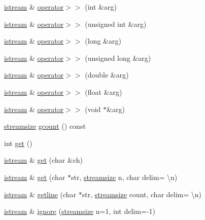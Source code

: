 \begin{DoxyCompactItemize}
\item 
\hyperlink{classistream}{istream} \& \hyperlink{classistream_ae8451bc86d83828892d9d67c67b7f02b}{operator$>$$>$} (int \&arg)
\item 
\hyperlink{classistream}{istream} \& \hyperlink{classistream_a35c9847ebf7b822c5ec9742e9de19345}{operator$>$$>$} (unsigned int \&arg)
\item 
\hyperlink{classistream}{istream} \& \hyperlink{classistream_aa26e7f35e74d96803bb0dfb3fb0dc154}{operator$>$$>$} (long \&arg)
\item 
\hyperlink{classistream}{istream} \& \hyperlink{classistream_a5aafa4c7f6615a7f1441962b61b8ef59}{operator$>$$>$} (unsigned long \&arg)
\item 
\hyperlink{classistream}{istream} \& \hyperlink{classistream_af9bf453725ce1d9ef62142a7ee38936e}{operator$>$$>$} (double \&arg)
\item 
\hyperlink{classistream}{istream} \& \hyperlink{classistream_aa8efce6fecab80cf7a17d5dfa31f5aa8}{operator$>$$>$} (float \&arg)
\item 
\hyperlink{classistream}{istream} \& \hyperlink{classistream_a62ef4762feacc64a8acdcbf8f1296936}{operator$>$$>$} (void $\ast$\&arg)
\item 
\hyperlink{classios__base_a82836e1d3cc603fba8f0b54d323a2dff}{streamsize} \hyperlink{classistream_ad2b705d2f363ed59db6ac4046f78b4bb}{gcount} () const 
\item 
int \hyperlink{classistream_a36573c9b7fc522e6c85a73221019fd11}{get} ()
\item 
\hyperlink{classistream}{istream} \& \hyperlink{classistream_a9c7313d6f21f1f7ac9b0e759e74b4db2}{get} (char \&ch)
\item 
\hyperlink{classistream}{istream} \& \hyperlink{classistream_a4247f47e388598c69ef3bd39ea4c056f}{get} (char $\ast$str, \hyperlink{classios__base_a82836e1d3cc603fba8f0b54d323a2dff}{streamsize} n, char delim= \textquotesingle{}\textbackslash{}n\textquotesingle{})
\item 
\hyperlink{classistream}{istream} \& \hyperlink{classistream_a8a12c4939d6029408b3dbe89a7595c37}{getline} (char $\ast$str, \hyperlink{classios__base_a82836e1d3cc603fba8f0b54d323a2dff}{streamsize} count, char delim= \textquotesingle{}\textbackslash{}n\textquotesingle{})
\item 
\hyperlink{classistream}{istream} \& \hyperlink{classistream_a12597b03d86b66047a5581bbd26eb032}{ignore} (\hyperlink{classios__base_a82836e1d3cc603fba8f0b54d323a2dff}{streamsize} n=1, int delim=-\/1)
\item 

\end{DoxyCompactItemize}

